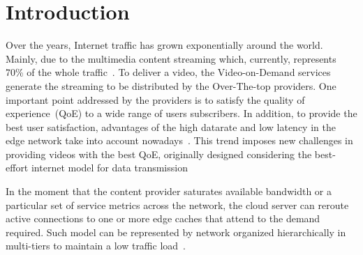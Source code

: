 \section{Introduction}
\label{sec:introduction}


Over the years, Internet traffic has grown exponentially around the world. Mainly, due to the multimedia content streaming which, currently, represents 70\% of the whole traffic~\cite{cisco:forecast}. To deliver a video, the Video-on-Demand services generate the streaming to be distributed by the Over-The-top providers. One important point addressed by the providers is to satisfy the quality of experience~(QoE) to a wide range of users subscribers. In addition, to provide the best user satisfaction, advantages of the high datarate and low latency in the edge network take into account nowadays~\cite{gamaUCC2019,DBLP:CoRR:2021,ye:ITC17}. This trend imposes new challenges in providing videos with the best QoE, originally designed considering the best-effort internet model for data transmission

In the moment that the content provider saturates available bandwidth or a particular set of service metrics across the network, the cloud server can reroute active connections to one or more edge caches that attend to the demand required. Such model can be represented by network organized hierarchically in multi-tiers to maintain a low traffic load~\cite{rosarioSENSORS2018}.

